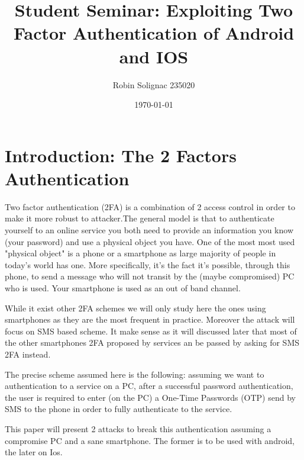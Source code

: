 \documentclass[11pt, a4paper,twocolumn]{article}
\title{Student Seminar: Exploiting Two Factor Authentication of Android and IOS}
\author{Robin Solignac 235020}
\date{\today}
\begin{document}
\maketitle
\begin{comment}
\begin{abstract}
Applications  which  can  be  used  in  different  platforms  now  use  two
factor authentication (2FA) to allow users to conveniently switch from one platform to another.
For example, when a user tries to login his gmail, it is not enough to enter correct password 
(first factor), it is also necessary to enter a PIN which is received by an SMS (second factor).
The aim of this project explaining the attacks against 2FA in IOS and Android devices and 
what can be the solutions. 
\end{abstract}
\end{comment}

\section{Introduction: The 2 Factors Authentication}

Two factor authentication (2FA) is a combination of 2 access control  in order to make it more robust to attacker.The general model is that to authenticate yourself to an online service you both need to provide an information you know (your password) and use a physical object you have. 
One of the most most used "physical object" is a phone or a smartphone as large majority of people in today's world has one.
More specifically, it's the fact it's possible, through this phone, to send a message who will not transit by the (maybe compromised) PC who is used. Your smartphone is used as an out of band channel.

While it exist other 2FA schemes we will only study here the ones using smartphones as they are the most frequent in practice. Moreover the attack will focus on SMS based scheme.
It make sense as it will discussed later that most of the other smartphones 2FA proposed by services an be passed by asking for SMS 2FA instead.

The precise scheme assumed here is the following: assuming we want to authentication to a service on a PC, after a successful password authentication, the user is required to enter (on the PC) a One-Time Passwords (OTP) send by SMS to the phone in order to fully authenticate to the service. 

This paper will present 2 attacks to break this authentication assuming a compromise PC and a sane smartphone. The former is to be used with android, the later on Ios.
\end{document}
